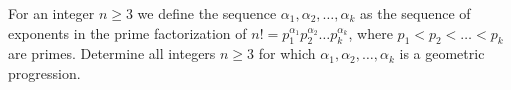 For an integer $n \geq 3$ we define the sequence $\alpha_1, \alpha_2, \ldots, \alpha_k$ as the sequence of exponents in the prime factorization of $n! = p_1^{\alpha_1}p_2^{\alpha_2} \ldots p_k^{\alpha_k}$,  where $p_1 < p_2 < \ldots < p_k$ are primes. Determine all integers $n \geq 3$ for which $\alpha_1, \alpha_2, \ldots, \alpha_k$ is a geometric progression.